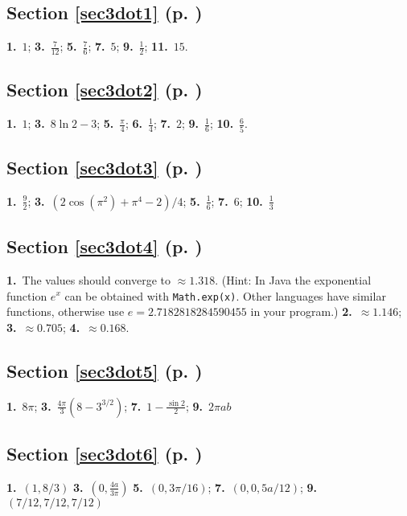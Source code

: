 \begin{multicols}{2}
\subsection*{Section \ref{sec3dot1} (p. \pageref{sec3dot1})}
\textbf{1.}~$1$;\quad
\textbf{3.}~$\frac{7}{12}$;\quad
\textbf{5.}~$\frac{7}{6}$;\quad
\textbf{7.}~$5$;\quad
\textbf{9.}~$\frac{1}{2}$;\quad
\textbf{11.}~$15$.
\subsection*{Section \ref{sec3dot2} (p. \pageref{sec3dot2})}
\textbf{1.}~$1$;\quad
\textbf{3.}~$8\ln 2 - 3$;\quad
\textbf{5.}~$\frac{\pi}{4}$;\quad
\textbf{6.}~$\frac{1}{4}$;\quad
\textbf{7.}~$2$;\quad
\textbf{9.}~$\frac{1}{6}$;\quad
\textbf{10.}~$\frac{6}{5}$.
\subsection*{Section \ref{sec3dot3} (p. \pageref{sec3dot3})}

\textbf{1.}~$\frac{9}{2}$;\quad
\textbf{3.}~$(2\cos(\pi^2) + \pi^4 -2)/4$;\quad
\textbf{5.}~$\frac{1}{6}$;\quad
\textbf{7.}~$6$;\quad
\textbf{10.}~$\frac{1}{3}$
\subsection*{Section \ref{sec3dot4} (p. \pageref{sec3dot4})}
\textbf{1.}~The values should converge to $\approx 1.318$. (Hint: In Java the exponential function $e^x$ can be obtained
with \texttt{Math.exp(x)}. Other languages have
similar functions, otherwise use $e=2.7182818284590455$ in your program.)
\textbf{2.}~$\approx 1.146$;\quad
\textbf{3.}~$\approx 0.705$;\quad
\textbf{4.}~$\approx 0.168$.
\subsection*{Section \ref{sec3dot5} (p. \pageref{sec3dot5})}

\textbf{1.}~$8\pi$;\quad
\textbf{3.}~$\frac{4\pi}{3}(8-3^{3/2})$;\quad
\textbf{7.}~$1-\frac{\sin 2}{2}$;\quad
\textbf{9.}~$2\pi ab$

\subsection*{Section \ref{sec3dot6} (p. \pageref{sec3dot6})}

\textbf{1.}~$(1,8/3)$\quad
\textbf{3.}~$(0,\frac{4a}{3\pi})$\quad
\textbf{5.}~$(0,3\pi/16)$;\quad
\textbf{7.}~$(0,0,5a/12)$;\quad
\textbf{9.}~$(7/12,7/12,7/12)$

\end{multicols}
